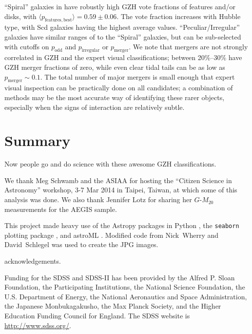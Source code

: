 \documentclass[twocolumn]{aastex6}
\begin{document}
``Spiral'' galaxies in \citet{bun05} have robustly high GZH vote fractions of features and/or disks, with $\langle p_\mathrm{features,best}\rangle=0.59\pm0.06$. The vote fraction increases with Hubble type, with Scd galaxies having the highest average \pbest{} values. ``Peculiar/Irregular'' galaxies have similar ranges of \pbest{} to the ``Spiral'' galaxies, but can be sub-selected with cutoffs on $p_\mathrm{odd}$ and $p_\mathrm{irregular}$ or $p_\mathrm{merger}$. We note that mergers are not strongly correlated in GZH and the expert visual classifications; between 20\%--30\% have GZH merger fractions of zero, while even clear tidal tails can be as low as $p_\mathrm{merger}\sim0.1$. The total number of major mergers is small enough that expert visual inspection can be practically done on all candidates; a combination of methods may be the most accurate way of identifying these rarer objects, especially when the signs of interaction are relatively subtle. 

\section{Summary}\label{sec:summary}

Now people go and do science with these awesome GZH classifications. 
 
\acknowledgments

We thank Meg Schwamb and the ASIAA for hosting the ``Citizen Science in Astronomy'' workshop, 3-7 Mar 2014 in Taipei, Taiwan, at which some of this analysis was done. We also thank Jennifer Lotz for sharing her $G$-$M_{20}$ measurements for the AEGIS sample.

This project made heavy use of the Astropy packages in Python \citep{ast13}, the \texttt{seaborn} plotting package \citep{was15}, and astroML \citep{van12}. Modified code from Nick~Wherry and David~Schlegel was used to create the JPG images. 

\hubble{} acknowledgements.

Funding for the SDSS and SDSS-II has been provided by the Alfred P. Sloan Foundation, the Participating Institutions, the National Science Foundation, the U.S. Department of Energy, the National Aeronautics and Space Administration, the Japanese Monbukagakusho, the Max Planck Society, and the Higher Education Funding Council for England. The SDSS website is \url{http://www.sdss.org/}. 
\end{document}
